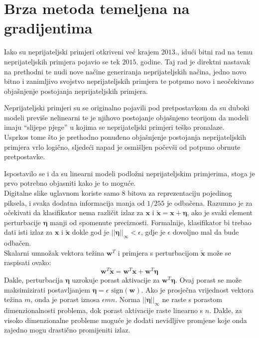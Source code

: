 \documentclass[utf8, diplomski]{fer}
\begin{document}
\section{Brza metoda temeljena na gradijentima}\label{fgm}
Iako su neprijateljski primjeri otkriveni već krajem $2013.$, idući bitni rad na temu neprijateljskih primjera pojavio se tek $2015.$ godine\citep{Goodfellow2015ExplainingAH}. Taj rad je direktni nastavak na prethodni te nudi nove načine generiranja neprijateljskih načina, jedno novo bitno i zanimljivo svojstvo neprijateljskih primjera te potpuno novo i neočekivano objašnjenje postojanja neprijateljskih primjera.
\par
Neprijateljski primjeri su se originalno pojavili pod pretpostavkom da su duboki modeli previše nelinearni te je njihovo postojanje objašnjeno teorijom da modeli imaju ``slijepe pjege'' u kojima se neprijateljski primjeri teško pronalaze. \\
Usprkos tome što je prethodno ponuđeno objašnjenje postojanja neprijateljskih primjera vrlo logično, sljedeći napad je osmišljen počevši od potpuno obrnute pretpostavke.
\par
Ispostavilo se i da su linearni modeli podložni neprijateljskim primjerima, stoga je prvo potrebno objasniti kako je to moguće. \\
Digitalne slike uglavnom koriste samo 8 bitova za reprezentaciju pojedinog piksela, i svaka dodatna informacija manja od $1/255$ je odbačena. Razumno je za očekivati da klasifikator nema različit izlaz za $\boldsymbol{x}$ i $\boldsymbol{\tilde{x}} = \boldsymbol{x} + \boldsymbol{\eta}$, ako je svaki element perturbacije $\boldsymbol{\eta}$ manji od spomenute preciznosti. Formalnije, klasifikator bi trebao dati isti izlaz za $\boldsymbol{x}$ i $\boldsymbol{\tilde{x}}$ dokle god je $||\boldsymbol{\eta}||_{\infty} < \epsilon$, gdje je $\epsilon$ dovoljno mal da bude odbačen. \\
Skalarni umnožak vektora težina $\boldsymbol{w}^{T}$ i primjera s perturbacijom $\boldsymbol{\tilde{x}}$ može se raspisati ovako:
\begin{equation}
	\boldsymbol{w}^{T}\boldsymbol{\tilde{x}} = \boldsymbol{w}^{T}\boldsymbol{x} + \boldsymbol{w}^{T}\boldsymbol{\eta}
\end{equation}
Dakle, perturbacija $\boldsymbol{\eta}$ uzrokuje porast aktivacije za $\boldsymbol{w}^{T}\boldsymbol{\eta}$. Ovaj porast se može maksimizirati postavljanjem $\boldsymbol{\eta} = \epsilon \text{ sign}(\boldsymbol{w})$. Ako je prosječna vrijednost vektora težina $m$, onda je porast iznosa $\epsilon mn$. Norma $||\boldsymbol{\eta}||_{\infty}$ ne raste s porastom dimenzionalnosti problema, dok porast aktivacije raste linearno s $n$. Dakle, za visoko dimenzionalne probleme moguće je dodati nevidljive promjene koje onda zajedno mogu drastično promijeniti izlaz.
\end{document}
